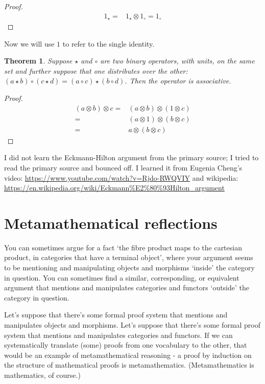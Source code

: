 \documentclass[a4paper]{article}
\newtheorem{theorem}{Theorem}
\begin{document}
\begin{proof}
  \begin{align*}
      1_\star = & 1_\star \otimes 1_\circ = 1_\circ
  \end{align*}
\end{proof}

Now we will use \(1\) to refer to the single identity.

\begin{theorem}
Suppose \( \star \) and \( \circ \) are two binary operators, with units, on the 
same set and further suppose that one distributes over the other:
\( (a \star b) \circ (c \star d) = (a \circ c) \star (b \circ d) \).
Then the operator is associative. 
\end{theorem}

\begin{proof}
\begin{align*}
(a \otimes b) \otimes c = & (a \otimes b) \otimes (1 \otimes c) \\
= & (a \otimes 1) \otimes (b \otimes c) \\
= & a \otimes (b \otimes c)
\end{align*}
\end{proof}


I did not learn the Eckmann-Hilton argument from the primary source; I 
tried to read the primary source\cite{eckmann1962group} and bounced 
off. I learned it from Eugenia Cheng's video:  
\url{https://www.youtube.com/watch?v=Rjdo-RWQVIY} and wikipedia: 
\url{https://en.wikipedia.org/wiki/Eckmann\%E2\%80\%93Hilton_argument}

\section{Metamathematical reflections}

You can sometimes argue for a fact `the fibre product maps to the cartesian product, in categories that have a terminal object', where your argument seems to be mentioning and manipulating objects and morphisms `inside' the category in question. You can sometimes find a similar, corresponding, or equivalent argument that mentions and manipulates categories and functors `outside' the category in question.

Let's suppose that there's some formal proof system that mentions and manipulates objects and morphisms.
Let's suppose that there's some formal proof system that mentions and manipulates categories and functors.
If we can systematically translate (some) proofs from one vocabulary to the other, that would be an example of metamathematical reasoning - a proof by induction on the structure of mathematical proofs is metamathematics.
(Metamathematics is mathematics, of course.)
\end{document}
